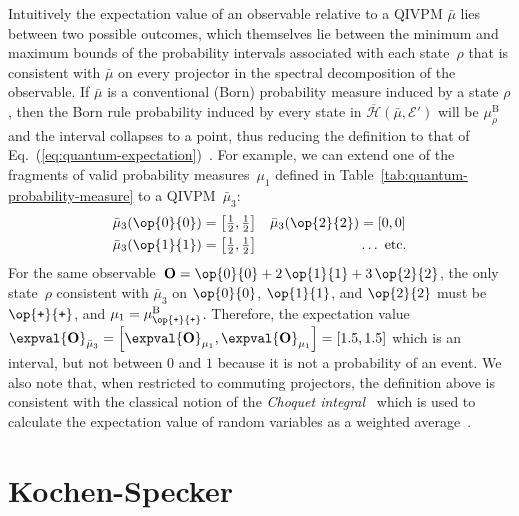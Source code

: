 \documentclass[english,reprint, aps, prl,superscriptaddress, showpacs,
showkeys, longbibliography, amsmath, amssymb, floatfix]{revtex4-1}
\theoremstyle{plain}
\theoremstyle{definition}
\newcommand{\Hilb}{\mathcal{H}}
\newcommand{\events}{\ensuremath{\mathcal{E}}}
\newcommand{\proj}[1]{\op{#1}{#1}}
\newcommand{\ps}{\texttt{+}}
\newcommand{\coreBorn}{\ensuremath{\overline{\Hilb}}}
\begin{document}
\noindent Intuitively the expectation value of an observable relative
to a QIVPM $\bar{\mu}$ lies between two possible outcomes, which
themselves lie between the minimum and maximum bounds of the probability
intervals associated with each state~$\rho$ that is consistent with
$\bar{\mu}$ on every projector in the spectral decomposition of the
observable. If $\bar{\mu}$ is a conventional (Born) probability measure
induced by a state $\rho$, then the Born rule probability induced
by every state in $\coreBorn\left(\bar{\mu},\events'\right)$ will
be $\mu_{\rho}^{\mathrm{B}}$ and the interval collapses to a point,
thus reducing the definition to that of Eq.~(\ref{eq:quantum-expectation})~\citep{HOSTunpublished}.
For example, we can extend one of the fragments of valid probability
measures~$\mu_{1}$ defined in Table~\ref{tab:quantum-probability-measure}
to a QIVPM~$\bar{\mu}_{3}$:
\begin{equation}
\begin{aligned}\bar{\mu}_{3}(\proj{0}) & =\left[\tfrac{1}{2},\tfrac{1}{2}\right] & \bar{\mu}_{3}(\proj{2}) & =\left[0,0\right]\\
\bar{\mu}_{3}(\proj{1}) & =\left[\tfrac{1}{2},\tfrac{1}{2}\right] &  & \ldots\textrm{ etc.}
\end{aligned}
\label{eq:Born-QIVPM}
\end{equation}
For the same observable~$\mathbf{O}=\proj{0}+2\,\proj{1}+3\,\proj{2}$,
the only state~$\rho$ consistent with $\bar{\mu}_{3}$ on $\proj{0}$,
$\proj{1}$, and $\proj{2}$ must be $\proj{\ps}$, and $\mu_{1}=\mu_{\proj{\ps}}^{\mathrm{B}}$.
Therefore, the expectation value~$\expval{\mathbf{O}}_{\bar{\mu}_{3}}=\left[\expval{\mathbf{O}}_{\mu_{1}},\expval{\mathbf{O}}_{\mu_{1}}\right]=\left[1.5,1.5\right]$
which is an interval, but not between $0$ and $1$ because it is
not a probability of an event. We also note that, when restricted
to commuting projectors, the definition above is consistent with the
classical notion of the \emph{Choquet integral}~\citep{GilboaSchmeidler1994,Grabisch2016}
which is used to calculate the expectation value of random variables
as a weighted average~\citep{HOSTunpublished}.

\section{Kochen-Specker} 
\label{sec:Kochen-Specker}
  
\end{document}
